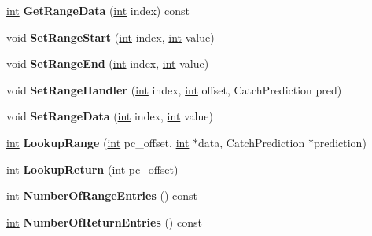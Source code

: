 \begin{DoxyCompactItemize}
\mbox{\label{classv8_1_1internal_1_1HandlerTable_a13d4091bae68fb254e099bf0810921de}} 
\mbox{\hyperlink{classint}{int}} {\bfseries Get\+Range\+Data} (\mbox{\hyperlink{classint}{int}} index) const
\item 
\mbox{\label{classv8_1_1internal_1_1HandlerTable_af003cc15ae2f99122d0dca3f8777b18c}} 
void {\bfseries Set\+Range\+Start} (\mbox{\hyperlink{classint}{int}} index, \mbox{\hyperlink{classint}{int}} value)
\item 
\mbox{\label{classv8_1_1internal_1_1HandlerTable_aa42488039d1e1fea69fda47b7f2f045f}} 
void {\bfseries Set\+Range\+End} (\mbox{\hyperlink{classint}{int}} index, \mbox{\hyperlink{classint}{int}} value)
\item 
\mbox{\label{classv8_1_1internal_1_1HandlerTable_a683448668d43ac5c6352c6d2c66fa2d7}} 
void {\bfseries Set\+Range\+Handler} (\mbox{\hyperlink{classint}{int}} index, \mbox{\hyperlink{classint}{int}} offset, Catch\+Prediction pred)
\item 
\mbox{\label{classv8_1_1internal_1_1HandlerTable_aa2afe5c8c465265e1150587dc5134b66}} 
void {\bfseries Set\+Range\+Data} (\mbox{\hyperlink{classint}{int}} index, \mbox{\hyperlink{classint}{int}} value)
\item 
\mbox{\label{classv8_1_1internal_1_1HandlerTable_afbfa1c81a6e8f7322bcf40bd16f71cf9}} 
\mbox{\hyperlink{classint}{int}} {\bfseries Lookup\+Range} (\mbox{\hyperlink{classint}{int}} pc\+\_\+offset, \mbox{\hyperlink{classint}{int}} $\ast$data, Catch\+Prediction $\ast$prediction)
\item 
\mbox{\label{classv8_1_1internal_1_1HandlerTable_af62d31c389403c24a2c8adccfd650413}} 
\mbox{\hyperlink{classint}{int}} {\bfseries Lookup\+Return} (\mbox{\hyperlink{classint}{int}} pc\+\_\+offset)
\item 
\mbox{\label{classv8_1_1internal_1_1HandlerTable_abd55a5ceb87387ad45d296c16741eb9f}} 
\mbox{\hyperlink{classint}{int}} {\bfseries Number\+Of\+Range\+Entries} () const
\item 
\mbox{\label{classv8_1_1internal_1_1HandlerTable_a2deadbbd6405c66f9d5739c89f5f4873}} 
\mbox{\hyperlink{classint}{int}} {\bfseries Number\+Of\+Return\+Entries} () const
\end{DoxyCompactItemize}
